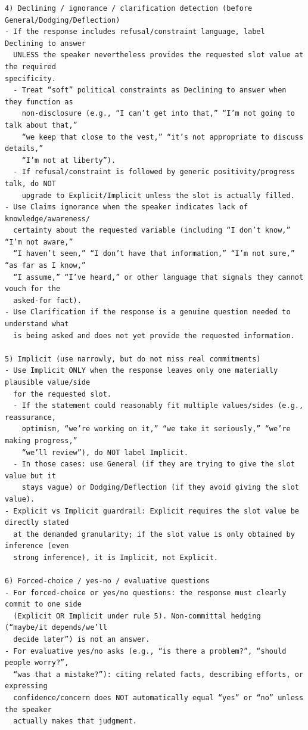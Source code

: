\documentclass[11pt]{article}
\begin{document}
\begin{lstlisting}[style=yaml]
4) Declining / ignorance / clarification detection (before General/Dodging/Deflection)
- If the response includes refusal/constraint language, label Declining to answer
  UNLESS the speaker nevertheless provides the requested slot value at the required
specificity.
  - Treat “soft” political constraints as Declining to answer when they function as
    non-disclosure (e.g., “I can’t get into that,” “I’m not going to talk about that,”
    “we keep that close to the vest,” “it’s not appropriate to discuss details,”
    “I’m not at liberty”).
  - If refusal/constraint is followed by generic positivity/progress talk, do NOT
    upgrade to Explicit/Implicit unless the slot is actually filled.
- Use Claims ignorance when the speaker indicates lack of knowledge/awareness/
  certainty about the requested variable (including “I don’t know,” “I’m not aware,”
  “I haven’t seen,” “I don’t have that information,” “I’m not sure,” “as far as I know,”
  “I assume,” “I’ve heard,” or other language that signals they cannot vouch for the
  asked-for fact).
- Use Clarification if the response is a genuine question needed to understand what
  is being asked and does not yet provide the requested information.

5) Implicit (use narrowly, but do not miss real commitments)
- Use Implicit ONLY when the response leaves only one materially plausible value/side
  for the requested slot.
  - If the statement could reasonably fit multiple values/sides (e.g., reassurance,
    optimism, “we’re working on it,” “we take it seriously,” “we’re making progress,”
    “we’ll review”), do NOT label Implicit.
  - In those cases: use General (if they are trying to give the slot value but it
    stays vague) or Dodging/Deflection (if they avoid giving the slot value).
- Explicit vs Implicit guardrail: Explicit requires the slot value be directly stated
  at the demanded granularity; if the slot value is only obtained by inference (even
  strong inference), it is Implicit, not Explicit.

6) Forced-choice / yes-no / evaluative questions
- For forced-choice or yes/no questions: the response must clearly commit to one side
  (Explicit OR Implicit under rule 5). Non-committal hedging (“maybe/it depends/we’ll
  decide later”) is not an answer.
- For evaluative yes/no asks (e.g., “is there a problem?”, “should people worry?”,
  “was that a mistake?”): citing related facts, describing efforts, or expressing
  confidence/concern does NOT automatically equal “yes” or “no” unless the speaker
  actually makes that judgment.


\end{lstlisting}
\end{document}
